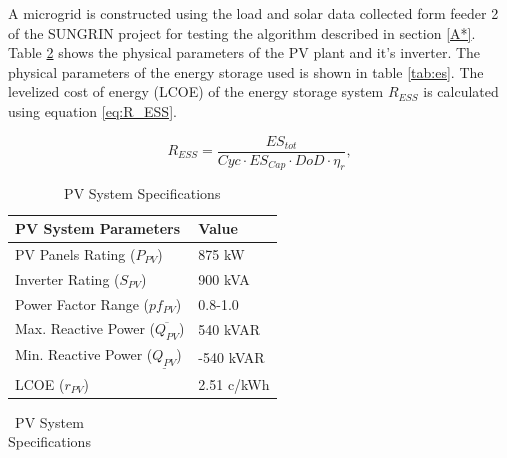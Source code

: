 A microgrid is constructed using the load and solar data collected form feeder 2 of the SUNGRIN project \cite{SUNGRIN} for testing the algorithm described in section \ref{A*}. Table \ref{tab:solar_pv} shows the physical parameters of the PV plant and it's inverter. The physical parameters of the energy storage used is shown in table \ref{tab:es}. The levelized cost of energy (LCOE)  of the energy storage system $R_{ESS}$ is calculated using equation \ref{eq:R_ESS}.

\begin{equation}
\label{eq:R_ESS}
R_{ESS} = \dfrac{ES_{tot}}{Cyc\cdot ES_{Cap}\cdot DoD\cdot \eta_{r}},
\end{equation}

\begin{table}[htb]
\normalsize
\renewcommand{\arraystretch}{1}
\caption{PV System Specifications}
\label{tab:solar_pv}
\centering
    \begin{tabular}{ | l | p{3cm} | }
    \hline
    \textbf{PV System Parameters} & \textbf{Value} \\ \hline
    PV Panels Rating (\(P_{PV}\)) & 875 kW  \\ \hline
    Inverter Rating (\(S_{PV}\)) & 900 kVA \\ \hline
    Power Factor Range (\(pf_{PV}\)) & 0.8-1.0  \\ \hline
    Max. Reactive Power (\(\overline{Q_{PV}}\)) & 540 kVAR \\ \hline
    Min. Reactive Power (\(\underline{Q_{PV}}\)) & -540 kVAR \\ \hline
    LCOE (\(r_{PV}\)) & 2.51 c/kWh \\ \hline
    \end{tabular}
    \begin{tabular}{l}
    \end{tabular}
\end{table}


